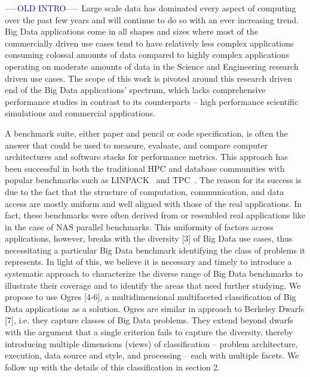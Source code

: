 \textcolor{blue}{-----OLD INTRO-----}
Large scale data has dominated every aspect of computing over the past few years and will continue to do so with an ever increasing trend. Big Data applications come in all shapes and sizes where most of the commercially driven use cases tend to have relatively less complex applications consuming colossal amounts of data compared to highly complex applications operating on moderate amounts of data in the Science and Engineering research driven use cases. The scope of this work is pivoted around this research driven end of the Big Data applications’ spectrum, which lacks comprehensive performance studies in contrast to its counterparts – high performance scientific simulations and commercial applications.

A benchmark suite, either paper and pencil or code specification, is often the answer that could be used to measure, evaluate, and compare computer architectures and software stacks for performance metrics. This approach has been successful in both the traditional \ac{HPC} and database communities with popular benchmarks such as LINPACK~\cite{Dongarra1988,linpack} and TPC~\cite{tpc}. The reason for its success is due to the fact that the structure of computation, communication, and data access are mostly uniform and well aligned with those of the real applications. In fact, these benchmarks were often derived from or resembled real applications like in the case of NAS parallel benchmarks. This uniformity of factors across applications, however, breaks with the diversity [3] of Big Data use cases, thus necessitating a particular Big Data benchmark identifying the class of problems it represents. In light of this, we believe it is necessary and timely to introduce a systematic approach to characterize the diverse range of Big Data benchmarks to illustrate their coverage and to identify the areas that need further studying. We propose to use Ogres [4-6], a multidimensional multifaceted classification of Big Data applications as a solution. Ogres are similar in approach to Berkeley Dwarfs [7], i.e. they capture classes of Big Data problems.  They extend beyond dwarfs with the argument that a single criterion fails to capture the diversity, thereby introducing multiple dimensions (views) of classification – problem architecture, execution, data source and style, and processing – each with multiple facets. We follow up with the details of this classification in section 2.

